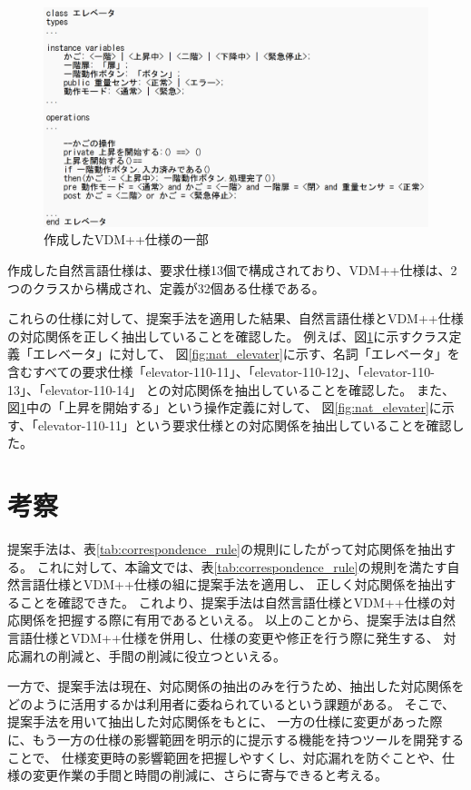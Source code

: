 \documentclass[a4j,twocolumn,10pt]{jceee-kyushu-euc}
\begin{document}
\begin{figure}[tp]
      \centering
      \includegraphics[width=\columnwidth]{../image/jceee/vdm_elevater.png}
      \caption{作成したVDM++仕様の一部}
      \label{fig:vdm_elevater}
\end{figure}

作成した自然言語仕様は、要求仕様13個で構成されており、VDM++仕様は、2つのクラスから構成され、定義が32個ある仕様である。

これらの仕様に対して、提案手法を適用した結果、自然言語仕様とVDM++仕様の対応関係を正しく抽出していることを確認した。
例えば、図\ref{fig:vdm_elevater}に示すクラス定義「エレベータ」に対して、
図\ref{fig:nat_elevater}に示す、名詞「エレベータ」を含むすべての要求仕様「elevator-110-11」、「elevator-110-12」、「elevator-110-13」、「elevator-110-14」
との対応関係を抽出していることを確認した。
また、図\ref{fig:vdm_elevater}中の「上昇を開始する」という操作定義に対して、
図\ref{fig:nat_elevater}に示す、「elevator-110-11」という要求仕様との対応関係を抽出していることを確認した。

\section{考察}
提案手法は、表\ref{tab:correspondence_rule}の規則にしたがって対応関係を抽出する。
これに対して、本論文では、表\ref{tab:correspondence_rule}の規則を満たす自然言語仕様とVDM++仕様の組に提案手法を適用し、
正しく対応関係を抽出することを確認できた。
これより、提案手法は自然言語仕様とVDM++仕様の対応関係を把握する際に有用であるといえる。
以上のことから、提案手法は自然言語仕様とVDM++仕様を併用し、仕様の変更や修正を行う際に発生する、
対応漏れの削減と、手間の削減に役立つといえる。

一方で、提案手法は現在、対応関係の抽出のみを行うため、抽出した対応関係をどのように活用するかは利用者に委ねられているという課題がある。
そこで、提案手法を用いて抽出した対応関係をもとに、
一方の仕様に変更があった際に、もう一方の仕様の影響範囲を明示的に提示する機能を持つツールを開発することで、
仕様変更時の影響範囲を把握しやすくし、対応漏れを防ぐことや、仕様の変更作業の手間と時間の削減に、さらに寄与できると考える。
\end{document}
